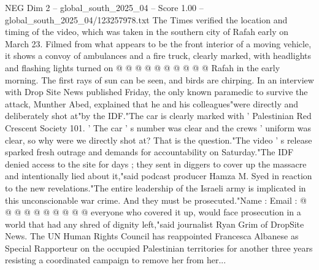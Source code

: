 \begin{textsample}{NEG Dim 2 – global\_south\_2025\_04 – Score 1.00 – global\_south\_2025\_04/123257978.txt}
The Times verified the location and timing of the video, which was taken in the southern city of Rafah early on March 23.
Filmed from what appears to be the front interior of a moving vehicle, it shows a convoy of ambulances and a fire truck, clearly marked, with headlights and flashing lights turned on @ @ @ @ @ @ @ @ @ @ Rafah in the early morning.
The first rays of sun can be seen, and birds are chirping.
In an interview with Drop Site News published Friday, the only known paramedic to survive the attack, Munther Abed, explained that he and his colleagues"were directly and deliberately shot at"by the IDF."The car is clearly marked with ' Palestinian Red Crescent Society 101. ' The car ' s number was clear and the crews ' uniform was clear, so why were we directly shot at?
That is the question."The video ' s release sparked fresh outrage and demands for accountability on Saturday."The IDF denied access to the site for days ; they sent in diggers to cover up the massacre and intentionally lied about it,"said podcast producer Hamza M.
Syed in reaction to the new revelations."The entire leadership of the Israeli army is implicated in this unconscionable war crime.
And they must be prosecuted."Name : Email : @ @ @ @ @ @ @ @ @ @ everyone who covered it up, would face prosecution in a world that had any shred of dignity left,"said journalist Ryan Grim of DropSite News.
The UN Human Rights Council has reappointed Francesca Albanese as Special Rapporteur on the occupied Palestinian territories for another three years resisting a coordinated campaign to remove her from her...

\end{textsample}
